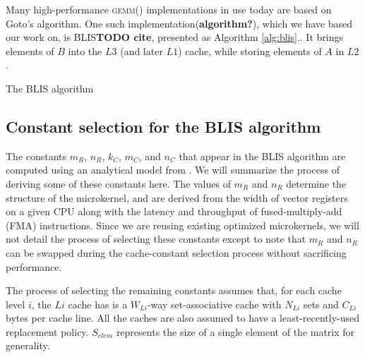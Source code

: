 \documentclass[12pt]{article}
\newcommand*{\TO}{\textbf{to}}
\newcommand*{\gemm}{{\textsc{gemm()}}}
\begin{document}
Many high-performance \gemm{} implementations in use today are based on Goto's algorithm\cite{Goto2008}.
One such implementation(\textbf{algorithm?}), which we have based our work on, is BLIS\textbf{TODO cite}, presented as Algorithm \ref{alg:blis}..
It brings elements of $B$ into the $L3$ (and later $L1$) cache, while storing elements of $A$ in $L2$.
\begin{algorithm}
  \caption{The BLIS algorithm}
  \label{alg:blis}
  \begin{tikzpicture}
    
  \end{tikzpicture}
  \begin{algorithmic}
    \For{$j \gets 0, n_C, \ldots$ \TO{} $n$}
    \For{$p \gets 0, k_C, \ldots$ \TO{} $k$}
    \For{$i \gets 0, m_C, \ldots$ \TO{} $m$}
    \EndFor{}
    \EndFor{}
    \EndFor{}
    \EndProcedure{}
  \end{algorithmic}
\end{algorithm}

\subsection{Constant selection for the BLIS algorithm}\label{subsec:constants}
The constants $m_R$, $n_R$, $k_C$, $m_C$, and $n_C$ that appear in the BLIS algorithm are computed using an analytical model from \cite{Low2016}.
We will summarize the process of deriving some of these constants here.
The values of $m_R$ and $n_R$ determine the structure of the microkernel, and are derived from the width of vector registers on a given CPU along with the latency and throughput of fused-multiply-add (FMA) instructions.
Since we are reusing existing optimized microkernels, we will not detail the process of selecting these constants except to note that $m_R$ and $n_R$ can be swapped during the cache-constant selection process without sacrificing performance.

The process of selecting the remaining constants assumes that, for each cache level $i$, the $Li$ cache has is a $W_{Li}$-way set-associative cache with $N_{Li}$ sets and $C_{Li}$ bytes per cache line.
All the caches are also assumed to have a least-recently-used replacement policy.
$S_{elem}$ represents the size of a single element of the matrix for generality.
\end{document}
